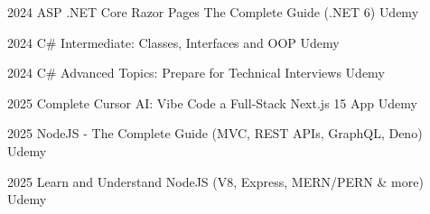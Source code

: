 \documentclass[letterpaper]{twentysecondcv} %
\begin{document}
{\begin{twenty}
        

        \twentyitem
        {2024}
        {
            {ASP .NET Core Razor Pages The Complete Guide (.NET 6)}
        }
        {Udemy}
        {}

        \twentyitem
        {2024}
        {
            {C\# Intermediate: Classes, Interfaces and OOP}
        }
        {Udemy}
        {}

        \twentyitem
        {2024}
        {
            {C\# Advanced Topics: Prepare for Technical Interviews}
        }
        {Udemy}
        {}
        
        \twentyitem
        {2025}
        {
            {Complete Cursor AI: Vibe Code a Full-Stack Next.js 15 App }
        }
        {Udemy}
        {}
        
        \twentyitem
        {2025}
        {
            {NodeJS - The Complete Guide (MVC, REST APIs, GraphQL, Deno) }
        }
        {Udemy}
        {}
        
        \twentyitem
        {2025}
        {
            {Learn and Understand NodeJS (V8, Express, MERN/PERN \& more)}
        }
        {Udemy}
        {}

\end{twenty}
}


 \restoregeometry
\end{document}

